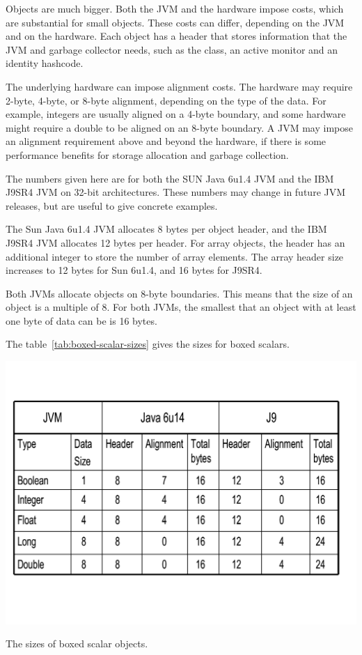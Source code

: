 \documentclass{book}
\theoremstyle{definition}
\begin{document}
Objects are much bigger. Both the JVM and the hardware impose costs, which are substantial for small objects. These costs can differ, depending on the JVM and on the hardware.  Each object has a header that stores information that the JVM and garbage collector needs, such as the class, an active monitor and an identity hashcode. 

The underlying hardware can impose alignment costs. The hardware may require 2-byte, 4-byte, or 8-byte alignment, depending on the type of the data. For example, integers are usually aligned on a 4-byte boundary, and some hardware might require a double to be aligned on an 8-byte boundary. A JVM may impose an alignment requirement above and beyond the hardware, if there is some performance benefits for storage allocation and garbage collection. 

The numbers given here are for both the SUN Java 6u1.4 JVM and the IBM J9SR4 JVM on 32-bit architectures. These numbers may change in future JVM releases, but are useful to give concrete examples.
   
The Sun Java 6u1.4 JVM allocates 8 bytes per object header, and the IBM J9SR4 JVM allocates 12 bytes per header. For array objects, the header has an additional integer to store the number of array elements. The array header size increases to 12 bytes for Sun 6u1.4, and 16 bytes for J9SR4. 

Both JVMs allocate objects on 8-byte boundaries. This means that the size of an object is a multiple of 8. For both JVMs, the smallest that an object with at least one byte of data can be is 16 bytes. 

The table~\ref{tab:boxed-scalar-sizes} gives the sizes for boxed scalars.

\begin{table}
  \centering
 \includegraphics[width=.60\textwidth]{Figures/chapter4/boxed-scalar-sizes.pdf}
  \caption{The sizes of boxed scalar objects.}
  \label{tab:boxed-scalar-sizes}
\end{table} 
\end{document}
